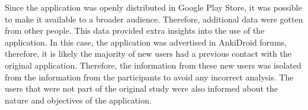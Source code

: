 Since the application was openly distributed in Google Play Store, it was possible to make it available to a broader audience. Therefore, additional data were gotten from other people. This data provided extra insights into the use of the application. In this case, the application was advertised in AnkiDroid forums, therefore, it is likely the majority of new users had a previous contact with the original application. Therefore, the information from these new users was isolated from the information from the participants to avoid any incorrect analysis. The users that were not part of the original study were also informed about the nature and objectives of the application.
